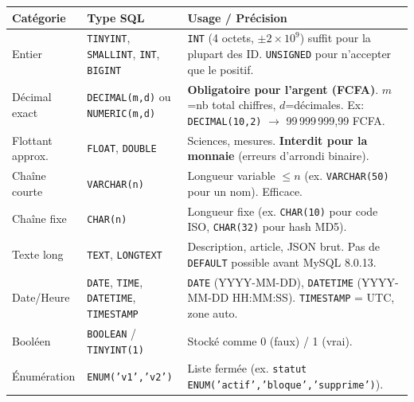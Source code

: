 \documentclass[11pt]{article}
\begin{document}
\begin{propriete}
\begin{center}
\begin{tabularx}{\linewidth}{|l|l|X|}\hline
\textbf{Catégorie} & \textbf{Type SQL} & \textbf{Usage / Précision} \\\hline
Entier & \texttt{TINYINT}, \texttt{SMALLINT}, \texttt{INT}, \texttt{BIGINT} & \texttt{INT} (4 octets, $\pm 2 \times 10^9$) suffit pour la plupart des ID. \texttt{UNSIGNED} pour n'accepter que le positif. \\\hline
Décimal exact & \texttt{DECIMAL(m,d)} ou \texttt{NUMERIC(m,d)} & \textbf{Obligatoire pour l'argent (FCFA)}. $m$=nb total chiffres, $d$=décimales. Ex: \texttt{DECIMAL(10,2)} $\to$ 99\,999\,999,99 FCFA. \\\hline
Flottant approx. & \texttt{FLOAT}, \texttt{DOUBLE} & Sciences, mesures. \textbf{Interdit pour la monnaie} (erreurs d'arrondi binaire). \\\hline
Chaîne courte & \texttt{VARCHAR(n)} & Longueur variable $\le n$ (ex. \texttt{VARCHAR(50)} pour un nom). Efficace. \\\hline
Chaîne fixe & \texttt{CHAR(n)} & Longueur fixe (ex. \texttt{CHAR(10)} pour code ISO, \texttt{CHAR(32)} pour hash MD5). \\\hline
Texte long & \texttt{TEXT}, \texttt{LONGTEXT} & Description, article, JSON brut. Pas de \texttt{DEFAULT} possible avant MySQL 8.0.13. \\\hline
Date/Heure & \texttt{DATE}, \texttt{TIME}, \texttt{DATETIME}, \texttt{TIMESTAMP} & \texttt{DATE} (YYYY-MM-DD), \texttt{DATETIME} (YYYY-MM-DD HH:MM:SS). \texttt{TIMESTAMP} = UTC, zone auto. \\\hline
Booléen & \texttt{BOOLEAN} / \texttt{TINYINT(1)} & Stocké comme 0 (faux) / 1 (vrai). \\\hline
Énumération & \texttt{ENUM('v1','v2')} & Liste fermée (ex. \texttt{statut ENUM('actif','bloque','supprime')}). \\\hline
\end{tabularx}
\end{center}
\end{propriete}
\end{document}
